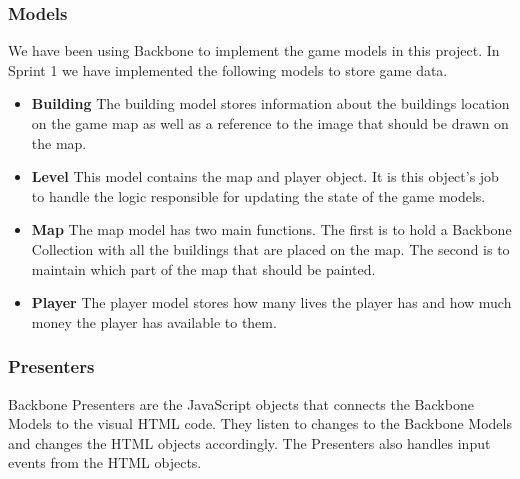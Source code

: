 \subsubsection*{Models}
	We have been using Backbone to implement the game models in this project. In Sprint 1 we have implemented 
	the following models to store game data.
	\begin{itemize}
		\item {\bf Building}
		The building model stores information about the buildings location on the game map as well as a reference 
		to the image that should be drawn on the map.
		\item {\bf Level}
		This model contains the map and player object. It is this object's job to handle the logic responsible for 
		updating the state of the game models.
		\item {\bf Map}
		The map model has two main functions. The first is to hold a Backbone Collection with all the buildings 
		that are placed on the map. The second is to maintain which part of the map that should be painted.
		\item {\bf Player} 
		The player model stores how many lives the player has and how much money the player has available to them.
	\end{itemize}

\subsubsection*{Presenters}
	Backbone Presenters are the JavaScript objects that connects the Backbone Models 
	to the visual HTML code. They listen to changes to the Backbone Models and changes 
	the HTML objects accordingly. The Presenters also handles input events from the HTML objects.
	
